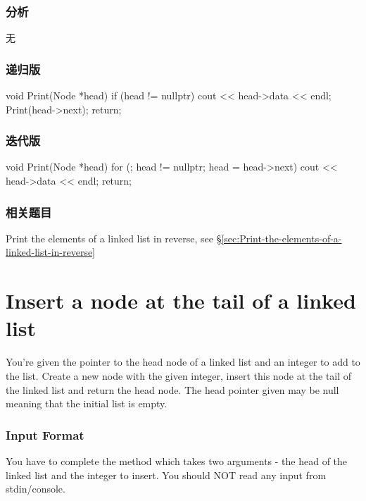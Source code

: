 \subsubsection{分析}
无


\subsubsection{递归版}
\begin{Code}
void Print(Node *head){
    if (head != nullptr) {
        cout << head->data << endl;
        Print(head->next);
    }
    return;
}
\end{Code}


\subsubsection{迭代版}
\begin{Code}
void Print(Node *head){
    for (; head != nullptr; head = head->next) {
        cout << head->data << endl;
    }
    return;
}
\end{Code}


\subsubsection{相关题目}
\begindot
\item Print the elements of a linked list in reverse, see \S \ref{sec:Print-the-elements-of-a-linked-list-in-reverse}
\myenddot


\section{Insert a node at the tail of a linked list} %
\label{sec:Insert-a-node-at-the-tail-of-a-linked-list}

You’re given the pointer to the head node of a linked list and an integer to add to the list. Create a new node with the given integer, insert this node at the tail of the linked list and return the head node. The head pointer given may be null meaning that the initial list is empty.


\subsubsection{Input Format}
You have to complete the  method which takes two arguments - the head of the linked list and the integer to insert. You should NOT read any input from stdin/console.


